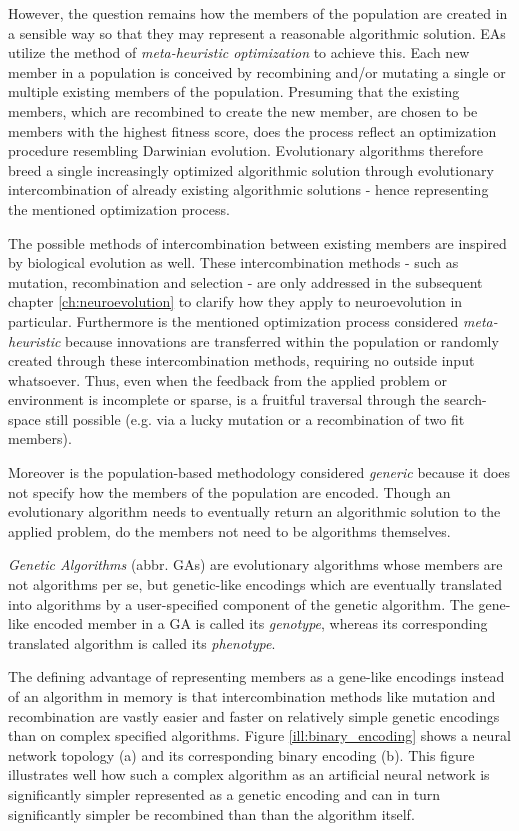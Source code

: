 \documentclass[journal, a4paper]{IEEEtran}
\begin{document}
However, the question remains how the members of the population are created in a sensible way so that they may represent a reasonable algorithmic solution. EAs utilize the method of \textit{meta-heuristic optimization} to achieve this. Each new member in a population is conceived by recombining and/or mutating a single or multiple existing members of the population. Presuming that the existing members, which are recombined to create the new member, are chosen to be members with the highest fitness score, does the process reflect an optimization procedure resembling Darwinian evolution. Evolutionary algorithms therefore breed a single increasingly optimized algorithmic solution through evolutionary intercombination of already existing algorithmic solutions - hence representing the mentioned optimization process. 

The possible methods of intercombination between existing members are inspired by biological evolution as well. These intercombination methods - such as mutation, recombination and selection - are only addressed in the subsequent chapter \ref{ch:neuroevolution} to clarify how they apply to neuroevolution in particular. Furthermore is the mentioned optimization process considered \textit{meta-heuristic} because innovations are transferred within the population or randomly created through these intercombination methods, requiring no outside input whatsoever. Thus, even when the feedback from the applied problem or environment is incomplete or sparse, is a fruitful traversal through the search-space still possible (e.g. via a lucky mutation or a recombination of two fit members).

Moreover is the population-based methodology considered \textit{generic} because it does not specify how the members of the population are encoded. Though an evolutionary algorithm needs to eventually return an algorithmic solution to the applied problem, do the members not need to be algorithms themselves.

\textit{Genetic Algorithms} (abbr. GAs) are evolutionary algorithms whose members are not algorithms per se, but genetic-like encodings which are eventually translated into algorithms by a user-specified component of the genetic algorithm. The gene-like encoded member in a GA is called its \textit{genotype}, whereas its corresponding translated algorithm is called its \textit{phenotype}.

The defining advantage of representing members as a gene-like encodings instead of an algorithm in memory is that intercombination methods like mutation and recombination are vastly easier and faster on relatively simple genetic encodings than on complex specified algorithms. Figure \ref{ill:binary_encoding} shows a neural network topology (a) and its corresponding binary encoding (b). This figure illustrates well how such a complex algorithm as an artificial neural network is significantly simpler represented as a genetic encoding and can in turn significantly simpler be recombined than than the algorithm itself.
\end{document}
